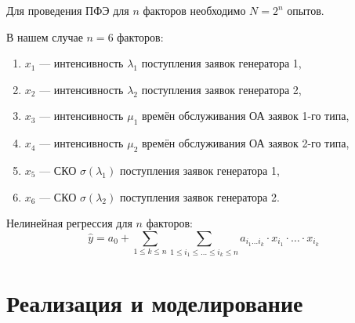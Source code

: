 \documentclass[a4paper, 14pt]{extreport}
\begin{document}
\begin{MainPart}
Для проведения ПФЭ для $n$ факторов необходимо $N = 2^n$ опытов.

В нашем случае $n = 6$ факторов:
\begin{enumerate}
	\item $x_1$ — интенсивность $\lambda_1$ поступления заявок генератора 1,
	\item $x_2$ — интенсивность $\lambda_2$ поступления заявок генератора 2,
	\item $x_3$ — интенсивность $\mu_1$ времён обслуживания ОА заявок 1-го типа,
	\item $x_4$ — интенсивность $\mu_2$ времён обслуживания ОА заявок 2-го типа,
	\item $x_5$ — СКО $\sigma(\lambda_1)$ поступления заявок генератора 1,
	\item $x_6$ — СКО $\sigma(\lambda_2)$ поступления заявок генератора 2.
\end{enumerate}

Нелинейная регрессия для $n$ факторов:
\begin{equation}
	\hat y = a_0 + \sum_{1 \leqslant k \leqslant n}\sum_{1 \leqslant i_1 \leqslant \ldots \leqslant i_k \leqslant n}a_{i_1\ldots i_k}\cdot x_{i_1} \cdot \ldots \cdot x_{i_k}
\end{equation}

\section{Реализация и моделирование}




\end{MainPart}
\end{document}
